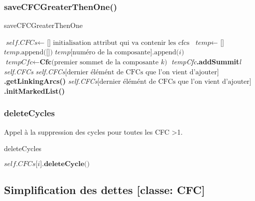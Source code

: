\documentclass[a4paper]{article}
\begin{document}
\subsubsection{saveCFCGreaterThenOne()}
\begin{algorithm}[H]
\caption{saveCFCGreaterThenOne}\label{save}
\begin{algorithmic}[1]
\State $\textit{self.CFCs} \gets \text{ [] initialisation attribut qui va contenir les cfcs} $
\State $\textit{temp} \gets \text{ []} $
\State $\textit{temp}\text{.append([])}$
\EndFor
\EndIf
\State $\textit{temp}\text{[numéro de la composante].append(}\textit{i}\text{)}$
\EndFor
{}
\State $\textit{tempCfc} \gets \textbf{Cfc}\text{(premier sommet de la composante}\textit{ k}\text{)}$
\State \textit{tempCfc}\textbf{.addSummit}\textit{l}
\EndFor
\State \textit{self.CFCs}
\State \textit{self.CFCs}$\text{[dernier élémént de CFCs que l'on vient d'ajouter]}$\textbf{.getLinkingArcs()}
\State \textit{self.CFCs}$\text{[dernier élémént de CFCs que l'on vient d'ajouter]}$\textbf{.initMarkedList()}
\EndIf
\EndFor
\EndProcedure
\end{algorithmic}
\end{algorithm}
\subsubsection{deleteCycles}
Appel à la suppression des cycles pour toutes les CFC >1.
\begin{algorithm}
\caption{deleteCycles}\label{delete}
\begin{algorithmic}[1]
\State $\textit{self.CFCs}\text{[}\textit{i}\text{]}\textbf{.deleteCycle()}$
\EndFor
\EndProcedure
\end{algorithmic}
\end{algorithm}
\subsection{Simplification des dettes [classe: CFC]}
\end{document}
